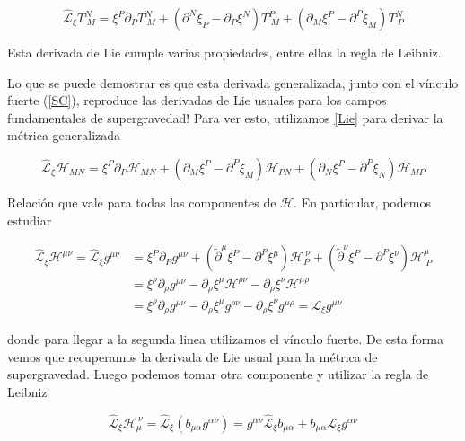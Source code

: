 \documentclass{article}
\numberwithin{equation}{section}
\begin{document}
\begin{equation}\label{Lie}
\hat{\mathcal{L}}_{\xi} T^N_{\ M} = \xi^P\partial_P T^N_{\ M} + \left(\partial^N \xi_P - \partial_P\xi^N\right)T^P_{\ M} + \left(\partial_M \xi^P - \partial^P\xi_M\right)T^N_{\ P}
\end{equation}

Esta derivada de Lie cumple varias propiedades, entre ellas la regla de Leibniz.

Lo que se puede demostrar es que esta derivada generalizada, junto con el vínculo fuerte (\ref{SC}), reproduce las derivadas de Lie usuales para los campos fundamentales de supergravedad! Para ver esto, utilizamos \ref{Lie} para derivar la métrica generalizada


\begin{equation}\label{Htransformation}
\hat{\mathcal{L}}_{\xi} \mathcal{H}_{MN} = \xi^P\partial_P \mathcal{H}_{MN} + \left(\partial_M \xi^P - \partial^P\xi_M\right)\mathcal{H}_{PN} + \left(\partial_N \xi^P - \partial^P\xi_N\right)\mathcal{H}_{MP}
\end{equation}

Relación que vale para todas las componentes de $ \pmb{\mathcal{H}} $. En particular, podemos estudiar

\begin{equation}\label{key}
\begin{aligned}
\hat{\mathcal{L}}_{\xi} \mathcal{H}^{\mu\nu}= \hat{\mathcal{L}}_{\xi} g^{\mu\nu} &= \xi^P\partial_P g^{\mu\nu} + \left(\widetilde{\partial}^{\mu} \xi^P - \partial^P\xi^{\mu}\right)\mathcal{H}_P^{\ \nu} + \left(\widetilde{\partial}^{\nu} \xi^P - \partial^P\xi^{\nu}\right)\mathcal{H}^{\mu}_{\ P}\\
&= \xi^{\rho}\partial_{\rho} g^{\mu\nu} - \partial_{\rho}\xi^{\mu}\mathcal{H}^{\rho\nu} -\partial_{\rho}\xi^{\nu}\mathcal{H}^{\mu\rho}\\
&=\xi^{\rho}\partial_{\rho} g^{\mu\nu} - \partial_{\rho}\xi^{\mu}g^{\rho\nu} -\partial_{\rho}\xi^{\nu}g^{\mu\rho} = \mathcal{L}_{\xi}g^{\mu\nu}
\end{aligned}
\end{equation}

donde para llegar a la segunda linea utilizamos el vínculo fuerte. De esta forma vemos que recuperamos la derivada de Lie usual para la métrica de supergravedad. Luego podemos tomar otra componente y utilizar la regla de Leibniz

\begin{equation}\label{segundacomponente}
\hat{\mathcal{L}}_{\xi} \mathcal{H}_{\mu}^{\ \nu} = \hat{\mathcal{L}}_{\xi} \left(b_{\mu\alpha}g^{\alpha\nu}\right) =  g^{\alpha \nu}  \hat{\mathcal{L}}_{\xi} b_{\mu\alpha} + b_{\mu\alpha} \mathcal{L}_{\xi} g^{\alpha \nu} 
\end{equation}
\end{document}
